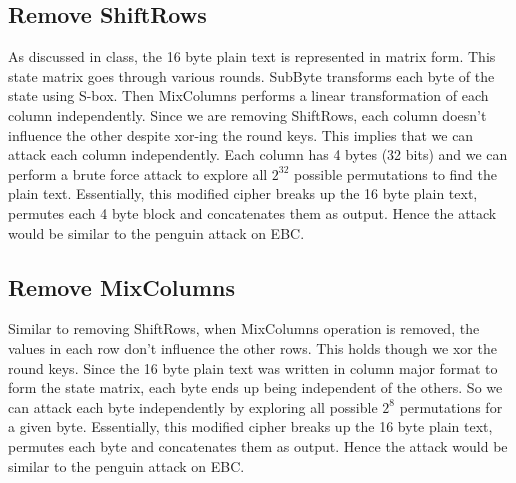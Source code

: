\documentclass{article}
\begin{document}
    \subsection*{Remove ShiftRows}
    As discussed in class, the 16 byte plain text is represented in matrix form. This state matrix goes through various rounds. SubByte transforms each byte of the state using S-box. Then MixColumns performs a linear transformation of each column independently. Since we are removing ShiftRows, each column doesn't influence the other despite xor-ing the round keys. This implies that we can attack each column independently. Each column has 4 bytes (32 bits) and we can perform a brute force attack to explore all $2^{32}$ possible permutations to find the plain text. Essentially, this modified cipher breaks up the 16 byte plain text, permutes each 4 byte block and concatenates them as output. Hence the attack would be similar to the penguin attack on EBC.

    \subsection*{Remove MixColumns}
    Similar to removing ShiftRows, when MixColumns operation is removed, the values in each row don't influence the other rows. This holds though we xor the round keys. Since the 16 byte plain text was written in column major format to form the state matrix, each byte ends up being independent of the others. So we can attack each byte independently by exploring all possible $2^{8}$ permutations for a given byte. Essentially, this modified cipher breaks up the 16 byte plain text, permutes each byte and concatenates them as output. Hence the attack would be similar to the penguin attack on EBC.
\end{document}
